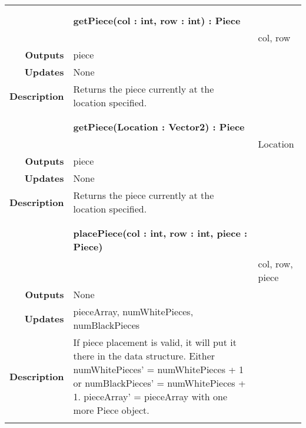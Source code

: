 \documentclass[10pt]{article}
\begin{document}
\begin{tabularx}{\linewidth}{ >{\bfseries}r Xp{2cm} }
\begin{tabular}[t]{@{} p{2.5cm} p{10cm}}
                                     & \\
                                     \end{tabular} \\
                            & \bf{getPiece(col : int, row : int)} : Piece \\
                            & \begin{tabular}[t]{@{} p{2.5cm} p{10cm}} 
                                    Inputs & col, row \\
                                    Outputs & piece \\
                                    Updates & None \\ 
			    Description & Returns the piece currently at the location specified. \\
                                     & \\
                                     \end{tabular} \\
							& \bf{getPiece(Location : Vector2)} : Piece \\
                            & \begin{tabular}[t]{@{} p{2.5cm} p{10cm}} 
                                    Inputs & Location \\
                                    Outputs & piece \\
                                    Updates & None \\ 
			    Description & Returns the piece currently at the location specified. \\
                                     & \\
                                     \end{tabular} \\
                            & \bf{placePiece(col : int, row : int, piece : Piece)} \\
                            & \begin{tabular}[t]{@{} p{2.5cm} p{10cm}}
                                    Inputs &  col, row, piece \\
                                    Outputs & None \\
                                    Updates & pieceArray, numWhitePieces, numBlackPieces \\ 
                                    Description & If piece placement is valid, it will put it there in the data structure. Either numWhitePieces' = numWhitePieces + 1 or numBlackPieces' = numWhitePieces + 1. pieceArray' = pieceArray with one more Piece object.\\

\end{tabular}
\end{tabularx}
\end{document}
